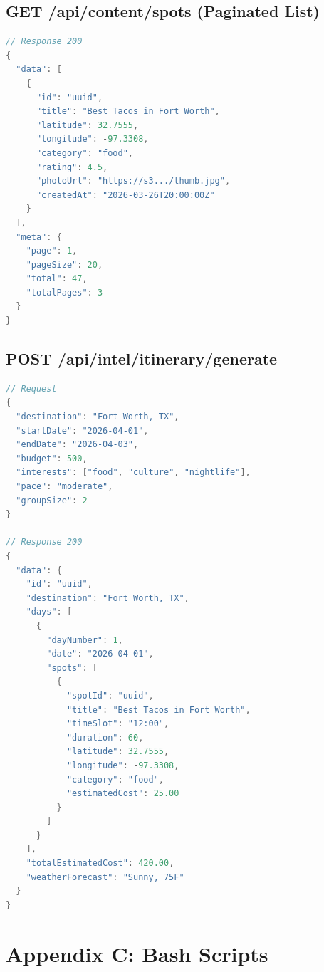 \documentclass[12pt,letterpaper]{article}
\begin{document}
\subsection{GET /api/content/spots (Paginated List)}
\begin{lstlisting}[style=code,language=Java]
// Response 200
{
  "data": [
    {
      "id": "uuid",
      "title": "Best Tacos in Fort Worth",
      "latitude": 32.7555,
      "longitude": -97.3308,
      "category": "food",
      "rating": 4.5,
      "photoUrl": "https://s3.../thumb.jpg",
      "createdAt": "2026-03-26T20:00:00Z"
    }
  ],
  "meta": {
    "page": 1,
    "pageSize": 20,
    "total": 47,
    "totalPages": 3
  }
}
\end{lstlisting}

\subsection{POST /api/intel/itinerary/generate}
\begin{lstlisting}[style=code,language=Java]
// Request
{
  "destination": "Fort Worth, TX",
  "startDate": "2026-04-01",
  "endDate": "2026-04-03",
  "budget": 500,
  "interests": ["food", "culture", "nightlife"],
  "pace": "moderate",
  "groupSize": 2
}

// Response 200
{
  "data": {
    "id": "uuid",
    "destination": "Fort Worth, TX",
    "days": [
      {
        "dayNumber": 1,
        "date": "2026-04-01",
        "spots": [
          {
            "spotId": "uuid",
            "title": "Best Tacos in Fort Worth",
            "timeSlot": "12:00",
            "duration": 60,
            "latitude": 32.7555,
            "longitude": -97.3308,
            "category": "food",
            "estimatedCost": 25.00
          }
        ]
      }
    ],
    "totalEstimatedCost": 420.00,
    "weatherForecast": "Sunny, 75F"
  }
}
\end{lstlisting}

\newpage

\section{Appendix C: Bash Scripts}
\end{document}
